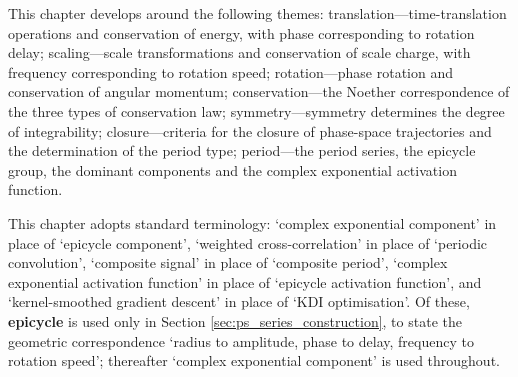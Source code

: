\begin{remark}\label{rem:periodic-system-themes}
This chapter develops around the following themes: translation---time-translation operations and conservation of energy, with phase corresponding to rotation delay; scaling---scale transformations and conservation of scale charge, with frequency corresponding to rotation speed; rotation---phase rotation and conservation of angular momentum; conservation---the Noether correspondence of the three types of conservation law; symmetry---symmetry determines the degree of integrability; closure---criteria for the closure of phase-space trajectories and the determination of the period type; period---the period series, the epicycle group, the dominant components and the complex exponential activation function.
\end{remark}

\begin{remark}\label{rem:periodic-system-terminology}
This chapter adopts standard terminology: `complex exponential component' in place of `epicycle component', `weighted cross-correlation' in place of `periodic convolution', `composite signal' in place of `composite period', `complex exponential activation function' in place of `epicycle activation function', and `kernel-smoothed gradient descent' in place of `KDI optimisation'. Of these, \textbf{epicycle} is used only in Section \ref{sec:ps_series_construction}, to state the geometric correspondence `radius to amplitude, phase to delay, frequency to rotation speed'; thereafter `complex exponential component' is used throughout.
\end{remark}

